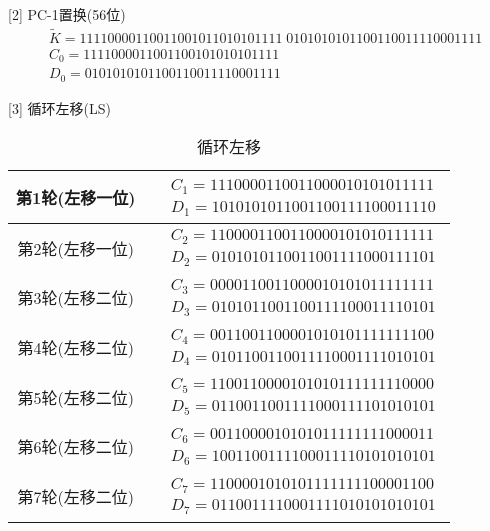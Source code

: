 \documentclass[UTF8]{ctexart}
\begin{document}
    [2] PC-1置换(56位)
    $$
    \begin{aligned}
        &\widetilde{K}=11110000110011001011010101111\; 0101010101100110011110001111\\
        &C_0=1111000011001100101010101111\\
        &D_0=0101010101100110011110001111
    \end{aligned}
    $$

    [3] 循环左移(LS)
    \begin{table}
        \centering
        \caption{循环左移}
        \begin{tabular}{|c|c|}
            \hline
            第1轮(左移一位) & $\begin{aligned} &C_1=1110000110011000010101011111\\ &D_1=1010101011001100111100011110 \end{aligned}$ \\
            \hline
            第2轮(左移一位) & $\begin{aligned} &C_2=1100001100110000101010111111\\ &D_2=0101010110011001111000111101 \end{aligned}$ \\
            \hline
            第3轮(左移二位) & $\begin{aligned} &C_3=0000110011000010101011111111\\ &D_3=0101011001100111100011110101 \end{aligned}$ \\
            \hline
            第4轮(左移二位) & $\begin{aligned} &C_4=0011001100001010101111111100\\ &D_4=0101100110011110001111010101 \end{aligned}$ \\
            \hline
            第5轮(左移二位) & $\begin{aligned} &C_5=1100110000101010111111110000\\ &D_5=0110011001111000111101010101 \end{aligned}$ \\
            \hline
            第6轮(左移二位) & $\begin{aligned} &C_6=0011000010101011111111000011\\ &D_6=1001100111100011110101010101 \end{aligned}$ \\
            \hline
            第7轮(左移二位) & $\begin{aligned} &C_7=1100001010101111111100001100\\ &D_7=0110011110001111010101010101 \end{aligned}$ \\

\end{tabular}
\end{table}
\end{document}
